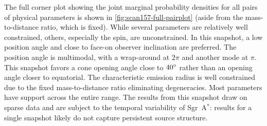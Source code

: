\documentclass[linenumbers, twocolumn, tighten]{aastex701}
\def\sgra{Sgr~A$^*$\xspace}
\begin{document}
The full corner plot showing the joint marginal probability densities for all pairs of physical parameters is shown in \autoref{fig:scan157-full-pairplot} (aside from the mass-to-distance ratio, which is fixed). While several parameters are relatively well constrained, others, especially the spin, are unconstrained. In this snapshot, a low position angle and close to face-on observer inclination are preferred. The position angle is multimodal, with a wrap-around at $2\pi$ and another mode at $\pi$. This snapshot favors a cone opening angle close to $40\degree$ rather than an opening angle closer to equatorial. The characteristic emission radius is well constrained due to the fixed mass-to-distance ratio eliminating degeneracies. 
Most parameters have support across the entire range. The results from this snapshot draw on sparse data and are subject to the temporal variability of \sgra: results for a single snapshot likely do not capture persistent source structure.
\end{document}
